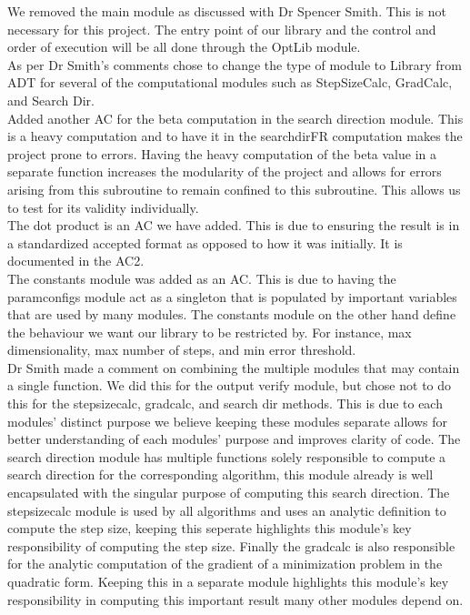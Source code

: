 \documentclass{article}
\begin{document}
We removed the main module as discussed with Dr Spencer Smith. This is not necessary for this project. The entry point of our library and the control and order of execution will be all done through the OptLib module.
\\

As per Dr Smith's comments chose to change the type of module to Library from ADT for several of the computational modules such as StepSizeCalc, GradCalc, and Search Dir.
\\

Added another AC for the beta computation in the search direction module. This is a heavy computation and to have it in the searchdirFR computation makes the project prone to errors. Having the heavy computation of the beta value in a separate function increases the modularity of the project and allows for errors arising from this subroutine to remain confined to this subroutine. This allows us to test for its validity individually.
\\

The dot product is an AC we have added. This is due to ensuring the result is in a standardized accepted format as opposed to how it was initially. It is documented in the AC2. 
\\

The constants module was added as an AC. This is due to having the paramconfigs module act as a singleton that is populated by important variables that are used by many modules. The constants module on the other hand define the behaviour we want our library to be restricted by. For instance, max dimensionality, max number of steps, and min error threshold.
\\

Dr Smith made a comment on combining the multiple modules that may contain a single function. We did this for the output verify module, but chose not to do this for the stepsizecalc, gradcalc, and search dir methods. This is due to each modules' distinct purpose we believe keeping these modules separate allows for better understanding of each modules' purpose and improves clarity of code. The search direction module has multiple functions solely responsible to compute a search direction for the corresponding algorithm, this module already is well encapsulated with the singular purpose of computing this search direction. The stepsizecalc module is used by all algorithms and uses an analytic definition to compute the step size, keeping this seperate highlights this module's key responsibility of computing the step size. Finally the gradcalc is also responsible for the analytic computation of the gradient of a minimization problem in the quadratic form. Keeping this in a separate module highlights this module's key responsibility in computing this important result many other modules depend on.
\\
\end{document}
